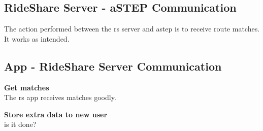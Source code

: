 \subsection{RideShare Server - aSTEP Communication}
The action performed between the \gls{rs} server and \gls{astep} is to receive route matches.
It works as intended.


\subsection{App - RideShare Server Communication}
\textbf{Get matches}\\
The \gls{rs} app receives matches goodly.

\textbf{Store extra data to new user}\\
is it done?